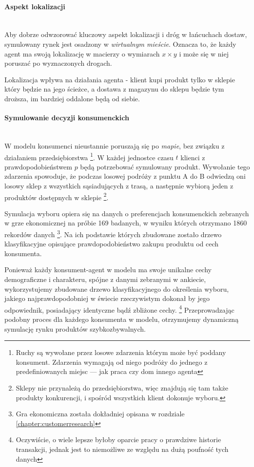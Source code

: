 \documentclass[polish, twoside, 12pt, a4paper]{article}
\theoremstyle{definition}
\theoremstyle{plain}
\theoremstyle{remark}
\begin{document}
\paragraph{Aspekt lokalizacji}\mbox{}\\

Aby dobrze odwzorować kluczowy aspekt lokalizacji i dróg w łańcuchach dostaw, symulowany rynek jest osadzony w \textit{wirtualnym mieście}. Oznacza to, że każdy agent ma swoją lokalizację w macierzy o wymiarach $x \times y$ i może się w niej poruszać po wyznaczonych drogach.

Lokalizacja wpływa na działania agenta - klient kupi produkt tylko w sklepie który będzie na jego ścieżce, a dostawa z magazynu do sklepu będzie tym droższa, im bardziej oddalone będą od siebie. 

\paragraph{Symulowanie decyzji konsumenckich}\mbox{}\\

W modelu konsumenci nieustannie poruszają się po \textit{mapie}, bez związku z działaniem przedsiębiorstwa \footnote{Ruchy są wywołane przez losowe zdarzenia którym może być poddany konsument. Zdarzenia wymagają od niego podróży do jednego z predefiniowanych miejsc --- jak praca czy dom innego agenta}. W każdej jednostce czasu $ t $ klienci z prawdopodobieństwem $ p $ będą potrzebować symulowany produkt. Wywołanie tego zdarzenia spowoduje, że podczas losowej podróży z punktu A do B odwiedzą oni losowy sklep z wszystkich sąsiadujących z trasą, a następnie wybiorą jeden z produktów dostępnych w sklepie \footnote{Sklepy nie przynależą do przedsiębiorstwa, więc znajdują się tam także produkty konkurencji, i spośród wszystkich klient dokonuje wyboru.}. 

Symulacja wyboru opiera się na danych o preferencjach konsumenckich zebranych w grze ekonomicznej na próbie 169 badanych, w wyniku których otrzymano 1860 rekordów danych \footnote{Gra ekonomiczna została dokładniej opisana w rozdziale \ref{chapter:customerresearch}}. Na ich podstawie których zbudowane zostało drzewo klasyfikacyjne opisujące prawdopodobieństwo zakupu produktu od cech konsumenta. 

Ponieważ każdy konsument-agent w modelu ma swoje unikalne cechy demograficzne i charakteru, spójne z danymi zebranymi w ankiecie, wykorzystujemy zbudowane drzewo klasyfikacyjnego do określenia wyboru, jakiego najprawdopodobniej w świecie rzeczywistym dokonał by jego odpowiednik, posiadający identyczne bądź zbliżone cechy. \footnote{Oczywiście, o wiele lepsze byłoby oparcie pracy o prawdziwe historie transakcji, jednak jest to niemożliwe ze względu na dużą poufność tych danych} Przeprowadzając podobny proces dla każdego konsumenta w modelu, otrzymujemy dynamiczną symulację rynku produktów szybkozbywalnych. 
\end{document}
